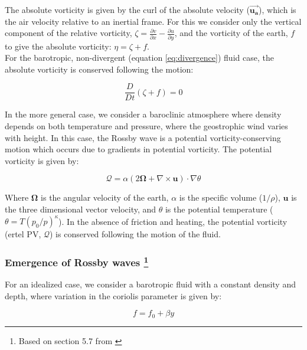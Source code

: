 \documentclass{article}
\begin{document}
The absolute vorticity is given by the curl of the absolute velocity ($\mathbf{\vec{u_a}}$), which is the air velocity relative to an inertial frame. For this we consider only the vertical component of the relative vorticity, $\zeta = \frac{\partial v}{\partial x} - \frac{\partial u}{\partial y}$, and the vorticity of the earth, $f$ to give the absolute vorticity: $\eta = \zeta + f$.\\

For the barotropic, non-divergent (equation \ref{eq:divergence}) fluid case, the absolute vorticity is conserved following the motion:

\begin{equation}
    \frac{D}{Dt}(\zeta + f) = 0
    \label{eq:conservation_of_absolute_vorticity}
\end{equation}


In the more general case, we consider a baroclinic atmosphere where density depends on both temperature and pressure, where the geostrophic wind varies with height. In this case, the Rossby wave is a potential vorticity-conserving motion which occurs due to gradients in potential vorticity. The potential vorticity is given by:

\begin{equation}
    \mathcal{Q} = \alpha (2 \mathbf{\Omega} + \nabla \times \mathbf{u}) \cdot \nabla \theta
    \label{eq:potential_vorticity}
\end{equation}

Where $\mathbf{\Omega}$ is the angular velocity of the earth, $\alpha$ is the specific volume ($1/\rho$), $\mathbf{u}$ is the three dimensional vector velocity, and $\theta$ is the potential temperature ($\theta = T (p_0/p)^{\kappa}$). In the absence of friction and heating, the potential vorticity (ertel PV, $\mathcal{Q}$) is conserved following the motion of the fluid.\\

\subsubsection*{Emergence of Rossby waves \footnote[1]{Based on section 5.7 from \cite{holton_introduction_2013}}}

For an idealized case, we consider a barotropic fluid with a constant density and depth, where variation in the coriolis parameter is given by:

\begin{equation}
    f = f_0 + \beta y
    \label{eq:coriolis_parameter}
\end{equation}
\end{document}
